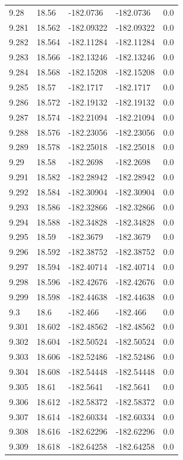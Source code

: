 \begin{tabular}{lllll}
9.28 & 18.56 & -182.0736 & -182.0736 & 0.0 \\
9.281 & 18.562 & -182.09322 & -182.09322 & 0.0 \\
9.282 & 18.564 & -182.11284 & -182.11284 & 0.0 \\
9.283 & 18.566 & -182.13246 & -182.13246 & 0.0 \\
9.284 & 18.568 & -182.15208 & -182.15208 & 0.0 \\
9.285 & 18.57 & -182.1717 & -182.1717 & 0.0 \\
9.286 & 18.572 & -182.19132 & -182.19132 & 0.0 \\
9.287 & 18.574 & -182.21094 & -182.21094 & 0.0 \\
9.288 & 18.576 & -182.23056 & -182.23056 & 0.0 \\
9.289 & 18.578 & -182.25018 & -182.25018 & 0.0 \\
9.29 & 18.58 & -182.2698 & -182.2698 & 0.0 \\
9.291 & 18.582 & -182.28942 & -182.28942 & 0.0 \\
9.292 & 18.584 & -182.30904 & -182.30904 & 0.0 \\
9.293 & 18.586 & -182.32866 & -182.32866 & 0.0 \\
9.294 & 18.588 & -182.34828 & -182.34828 & 0.0 \\
9.295 & 18.59 & -182.3679 & -182.3679 & 0.0 \\
9.296 & 18.592 & -182.38752 & -182.38752 & 0.0 \\
9.297 & 18.594 & -182.40714 & -182.40714 & 0.0 \\
9.298 & 18.596 & -182.42676 & -182.42676 & 0.0 \\
9.299 & 18.598 & -182.44638 & -182.44638 & 0.0 \\
9.3 & 18.6 & -182.466 & -182.466 & 0.0 \\
9.301 & 18.602 & -182.48562 & -182.48562 & 0.0 \\
9.302 & 18.604 & -182.50524 & -182.50524 & 0.0 \\
9.303 & 18.606 & -182.52486 & -182.52486 & 0.0 \\
9.304 & 18.608 & -182.54448 & -182.54448 & 0.0 \\
9.305 & 18.61 & -182.5641 & -182.5641 & 0.0 \\
9.306 & 18.612 & -182.58372 & -182.58372 & 0.0 \\
9.307 & 18.614 & -182.60334 & -182.60334 & 0.0 \\
9.308 & 18.616 & -182.62296 & -182.62296 & 0.0 \\
9.309 & 18.618 & -182.64258 & -182.64258 & 0.0 \\

\end{tabular}

